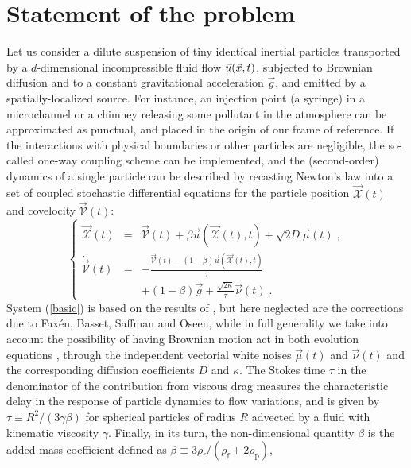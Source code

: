\section{Statement of the problem} \label{sec}
%
Let us consider a dilute suspension of tiny identical inertial particles transported by a $d$-dimensional incompressible fluid flow $\vec{u}(\vec{x},t)$,
subjected to Brownian diffusion and to a constant gravitational acceleration $\vec{g}$,
and emitted by a spatially-localized source. For instance, an injection point (a syringe) in a microchannel
or a chimney releasing some pollutant in the atmosphere can be approximated as punctual, and placed in the origin of our frame of reference.
If the interactions with physical boundaries or other particles are negligible, the so-called one-way coupling scheme can be implemented,
and the (second-order) dynamics of a single particle can be described by recasting Newton's law into a set of
coupled stochastic differential equations for the particle position $\vec{\mathcal{X}}(t)$ and covelocity $\vec{\mathcal{V}}(t)$:
\begin{equation} \label{basic} 
 \left\{\begin{array}{rcl}
   \dot{\vec{\mathcal{X}}}(t)&=&\vec{\mathcal{V}}(t)+\beta\vec{u}(\vec{\mathcal{X}}(t),t)+\sqrt{2D}\vec{\mu}(t)\;,\\[0.2cm]
   \dot{\vec{\mathcal{V}}}(t)&=&\displaystyle-\frac{\vec{\mathcal{V}}(t)-(1-\beta)\vec{u}(\vec{\mathcal{X}}(t),t)}{\tau}\\
   &&\displaystyle+(1-\beta)\vec{g}+\frac{\sqrt{2\kappa}}{\tau}\vec{\nu}(t)\;.
  \end{array}\right.
\end{equation}
System (\ref{basic}) is based on the results of \cite{G83,MR83},
but here neglected are the corrections due to Fax\'en, Basset, Saffman and Oseen,
while in full generality we take into account the possibility of having Brownian motion act in both evolution equations \cite{Z73,R88,CK98,MAG17,MAMGM17},
through the independent vectorial white noises $\vec{\mu}(t)$ and $\vec{\nu}(t)$ and the corresponding diffusion coefficients $D$ and $\kappa$.
The Stokes time $\tau$ in the denominator of the contribution from viscous drag measures the characteristic delay in the response
of particle dynamics to flow variations, and is given by $\tau\equiv R^2/(3\gamma\beta)$ for spherical particles
of radius $R$ advected by a fluid with kinematic viscosity $\gamma$. Finally, in its turn, the non-dimensional quantity $\beta$
is the added-mass coefficient defined as $\beta\equiv3\rho_{\mathrm{f}}/(\rho_{\mathrm{f}}+2\rho_{\mathrm{p}})$,
